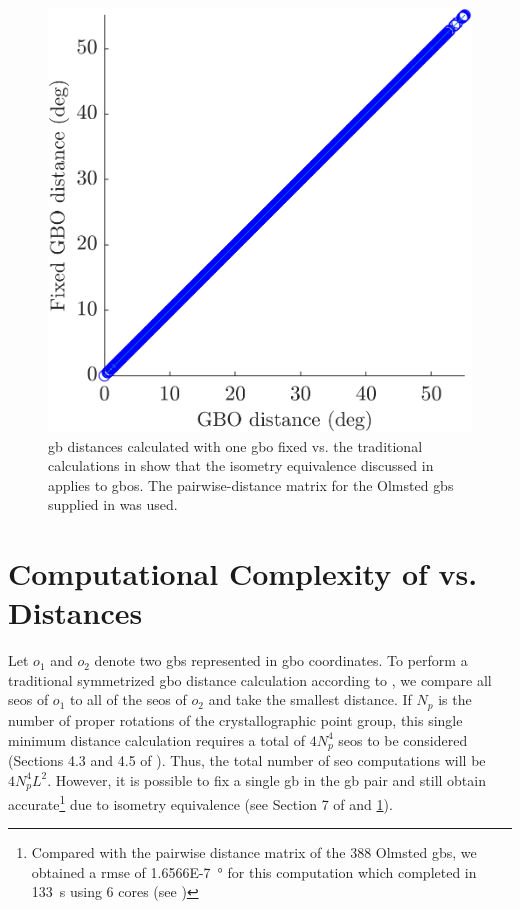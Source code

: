 \documentclass[preprint,12pt]{elsarticle}
\begin{document}
\begin{figure}
    \centering
    \includegraphics{figures/pd-fix.png}
    \caption{\Gls{gb} distances calculated with one \gls{gbo} fixed vs. the traditional calculations in \citet{chesserLearningGrainBoundary2020} show that the isometry equivalence discussed in \citet{morawiecDistancesGrainInterfaces2019} applies to \glspl{gbo}. The pairwise-distance matrix for the Olmsted \glspl{gb} supplied in \cite{chesserGBOctonionCode2019} was used. }
    \label{fig:pd-fix}
\end{figure}

\section{Computational Complexity of  vs.  Distances } \label{sec:computational-complexity}
Let $o_1$ and $o_2$ denote two \glspl{gb} represented in \gls{gbo} coordinates. 
To perform a traditional symmetrized \gls{gbo} distance calculation according to \citet{francisGeodesicOctonionMetric2019}, we compare all \glspl{seo} of $o_1$ to all of the \glspl{seo} of $o_2$ and take the smallest distance. If $N_p$ is the number of proper rotations of the crystallographic point group, this single minimum distance calculation requires a total of $4N_p^4$ \glspl{seo} to be considered (Sections 4.3 and 4.5 of \citet{francisGeodesicOctonionMetric2019}). Thus, the total number of \gls{seo} computations will be $4N_p^4L^2$. However, it is possible to fix a single \gls{gb} in the \gls{gb} pair and still obtain accurate\footnote{Compared with the pairwise distance matrix of the 388 Olmsted \glspl{gb}, we obtained a \gls{rmse} of \SI{1.6566E-7}{\degree} for this computation which completed in \SI{133}{\s} using 6 cores (see )} due to isometry equivalence (see Section 7 of \cite{morawiecDistancesGrainInterfaces2019} and \cref{fig:pd-fix}).
\end{document}
